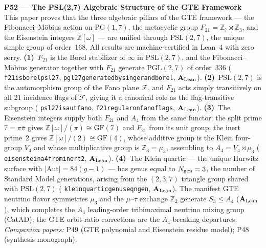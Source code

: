 \documentclass[11pt]{article}
\newcommand{\lean}[1]{%
  \penalty-100
  \begingroup\def\_{{\textunderscore\allowbreak}}\texttt{#1}\endgroup}
\newcommand{\CatAL}{\ensuremath{\textbf{A}_{\rm Lean}}}
\begin{document}
\medskip
\noindent\textbf{P52 --- The PSL(2,7) Algebraic Structure of the GTE Framework}~\cite{SpivackPSL27Unification}\\
This paper proves that the three algebraic pillars of the GTE framework --- the
Fibonacci--Möbius action on $\mathrm{PG}(1,7)$, the metacyclic group
$F_{21} = \mathbb{Z}_7 \rtimes \mathbb{Z}_3$, and the Eisenstein integers
$\mathbb{Z}[\omega]$ --- are unified through $\mathrm{PSL}(2,7)$, the unique
simple group of order~168.
All results are machine-certified in Lean~4 with zero sorry.
\textbf{(1)}~$F_{21}$ is the Borel stabilizer of $\infty$ in $\mathrm{PSL}(2,7)$,
and the Fibonacci--Möbius generator together with $F_{21}$ generate $\mathrm{PGL}(2,7)$
of order~336 (\lean{f21\_is\_borel\_psl27}, \lean{pgl27\_generated\_by\_singer\_and\_borel},
$\CatAL$).
\textbf{(2)}~$\mathrm{PSL}(2,7)$ is the automorphism group of the Fano plane
$\mathcal{F}$, and $F_{21}$ acts simply transitively on all 21 incidence flags
of $\mathcal{F}$, giving it a canonical role as the flag-transitive subgroup
(\lean{psl27\_is\_aut\_fano}, \lean{f21\_regular\_on\_fano\_flags}, $\CatAL$).
\textbf{(3)}~The Eisenstein integers supply both $F_{21}$ and $A_4$ from the same
functor: the split prime $7 = \pi\bar\pi$ gives $\mathbb{Z}[\omega]/(\pi) \cong
\mathrm{GF}(7)$ and $F_{21}$ from its unit group; the inert prime~2 gives
$\mathbb{Z}[\omega]/(2) \cong \mathrm{GF}(4)$, whose additive group is the
Klein four-group $V_4$ and whose multiplicative group is $\mathbb{Z}_3 = \mu_3$,
assembling to $A_4 = V_4 \rtimes \mu_3$
(\lean{eisenstein\_a4\_from\_inert\_2}, $\CatAL$).
\textbf{(4)}~The Klein quartic — the unique Hurwitz surface with
$|\mathrm{Aut}| = 84(g-1)$ — has genus equal to $N_{\rm gen} = 3$, the number
of Standard Model generations, arising from the $(2,3,7)$ triangle group shared
with $\mathrm{PSL}(2,7)$ (\lean{klein\_quartic\_genus\_eq\_n\_gen}, $\CatAL$).
The manifest GTE neutrino flavor symmetries $\mu_3$ and the $\mu$--$\tau$ exchange
$\mathbb{Z}_2$ generate $S_3 \leq A_4$ ($\CatAL$), which completes the
$A_4$ leading-order tribimaximal neutrino mixing group (CatAD); the GTE
orbit-ratio corrections are the $A_4$-breaking departures.
\emph{Companion papers:} P49 (GTE polynomial and Eisenstein residue model); P48 (synthesis monograph).
\end{document}
